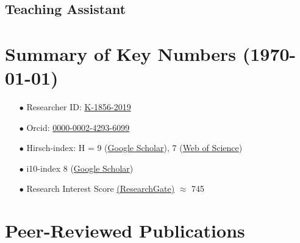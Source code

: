 \documentclass[11pt,a4paper,roman,english,colorlinks,linkcolor={red!50!black}]{moderncv}
\begin{document}
\subsection{Teaching Assistant}



\section{\textbf{Summary of Key Numbers (\today)}}
\begin{enumerate}[leftmargin=0.75cm]
	\item[$\bullet$] Researcher ID: \href{https://www.webofscience.com/wos/author/record/K-1856-2019}{K-1856-2019}
	\item[$\bullet$] Orcid: \href{https://orcid.org/0000-0002-4293-6099}{0000-0002-4293-6099}
	\item[$\bullet$] Hirsch-index: H = 9 (\href{https://scholar.google.com/citations?hl=en&user=67aQviYAAAAJ}{Google Scholar}), 7 (\href{https://www.webofscience.com/wos/author/record/K-1856-2019}{Web of Science})
	\item[$\bullet$] i10-index 8 (\href{https://scholar.google.com/citations?hl=en&user=67aQviYAAAAJ}{Google Scholar})
	\item[$\bullet$] Research Interest Score \href{https://www.researchgate.net/profile/Vatsal-Sanjay-2}{(ResearchGate)} $\approx$ 745
\end{enumerate}

\section{\textbf{Peer-Reviewed Publications}}
\end{document}
